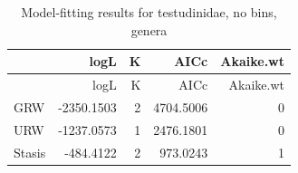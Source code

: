 \documentclass[]{article}
\begin{document}
\begin{longtable}[]{@{}lrrrr@{}}
\caption{Model-fitting results for testudinidae, no bins,
genera}\tabularnewline
\toprule
& logL & K & AICc & Akaike.wt\tabularnewline
\midrule
\endfirsthead
\toprule
& logL & K & AICc & Akaike.wt\tabularnewline
\midrule
\endhead
GRW & -2350.1503 & 2 & 4704.5006 & 0\tabularnewline
URW & -1237.0573 & 1 & 2476.1801 & 0\tabularnewline
Stasis & -484.4122 & 2 & 973.0243 & 1\tabularnewline
\bottomrule
\end{longtable}
\end{document}
